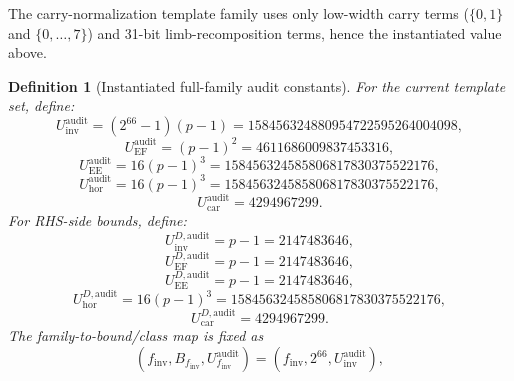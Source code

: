 ﻿\documentclass[11pt]{article}
\newtheorem{definition}[theorem]{Definition}
\begin{document}
The carry-normalization template family uses only low-width carry terms
(\(\{0,1\}\) and \(\{0,\dots,7\}\)) and 31-bit limb-recomposition terms, hence
the instantiated value above.

\begin{definition}[Instantiated full-family audit constants]
\label{def:instantiated-audit-constants}
For the current template set, define:
\begin{equation}
U_{\mathrm{inv}}^{\mathrm{audit}}
=
(2^{66}-1)(p-1)
=
158456324880954722595264004098,
\label{eq:u-inv-inst}
\end{equation}
\begin{equation}
U_{\mathrm{EF}}^{\mathrm{audit}}
=
(p-1)^2
=
4611686009837453316,
\label{eq:u-ef-inst}
\end{equation}
\begin{equation}
U_{\mathrm{EE}}^{\mathrm{audit}}
=
16(p-1)^3
=
158456324585806817830375522176,
\label{eq:u-ee-inst}
\end{equation}
\begin{equation}
U_{\mathrm{hor}}^{\mathrm{audit}}
=
16(p-1)^3
=
158456324585806817830375522176,
\label{eq:u-hor-inst}
\end{equation}
\begin{equation}
U_{\mathrm{car}}^{\mathrm{audit}}
=
4294967299.
\label{eq:u-car-inst}
\end{equation}
For RHS-side bounds, define:
\begin{equation}
U_{\mathrm{inv}}^{D,\mathrm{audit}}
=
p-1
=
2147483646,
\label{eq:u-inv-rhs-inst}
\end{equation}
\begin{equation}
U_{\mathrm{EF}}^{D,\mathrm{audit}}
=
p-1
=
2147483646,
\label{eq:u-ef-rhs-inst}
\end{equation}
\begin{equation}
U_{\mathrm{EE}}^{D,\mathrm{audit}}
=
p-1
=
2147483646,
\label{eq:u-ee-rhs-inst}
\end{equation}
\begin{equation}
U_{\mathrm{hor}}^{D,\mathrm{audit}}
=
16(p-1)^3
=
158456324585806817830375522176,
\label{eq:u-hor-rhs-inst}
\end{equation}
\begin{equation}
U_{\mathrm{car}}^{D,\mathrm{audit}}
=
4294967299.
\label{eq:u-car-rhs-inst}
\end{equation}
The family-to-bound/class map is fixed as
\[
(f_{\mathrm{inv}},B_{f_{\mathrm{inv}}},U_{f_{\mathrm{inv}}}^{\mathrm{audit}})
=(f_{\mathrm{inv}},2^{66},U_{\mathrm{inv}}^{\mathrm{audit}}),
\]
\end{definition}
\end{document}
